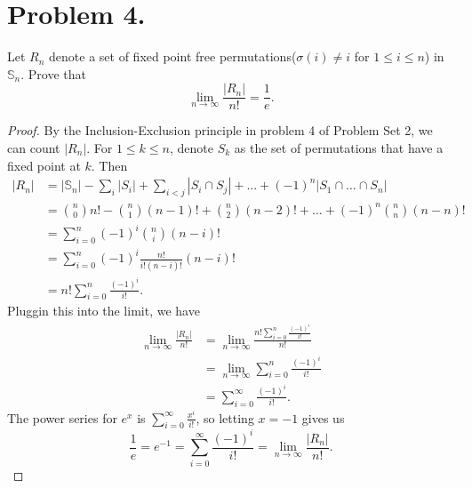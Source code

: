 \documentclass{article}
\begin{document}
\section{Problem 4.}
Let $R_n$ denote a set of fixed point free permutations($\sigma(i)\neq i$ for $1\leq i \leq n$) in $\mathbb{S}_n.$ Prove that
\[\lim_{n \rightarrow \infty}\frac{|R_n|}{n!} =\frac{1}{e}.\]
\begin{proof}
By the Inclusion-Exclusion principle in problem 4 of Problem Set 2, we can count $|R_n|$. For $1\leq k\leq n$, denote $S_k$ as the set of permutations that have a fixed point at $k$. Then
\begin{align*}
    |R_n|
    &=|\mathbb{S}_n|-\sum_i |S_i| + \sum_{i<j} |S_i\cap S_j| +...+(-1)^n|S_1\cap \dots \cap S_n|\\
    &=\binom{n}{0}n!-\binom{n}{1}(n-1)!+\binom{n}{2}(n-2)!+\dots+(-1)^n\binom{n}{n}(n-n)!\\
    &=\sum_{i=0}^n(-1)^i\binom{n}{i}(n-i)!\\
    &=\sum_{i=0}^n(-1)^i\frac{n!}{i!(n-i)!}(n-i)!\\
    &=n!\sum_{i=0}^n\frac{(-1)^i}{i!}.
\end{align*}
Pluggin this into the limit, we have
\begin{align*}
    \lim_{n \rightarrow \infty}\frac{|R_n|}{n!}
    &=\lim_{n \rightarrow \infty}\frac{n!\sum_{i=0}^n\frac{(-1)^i}{i!}}{n!}\\
    &=\lim_{n \rightarrow \infty}\sum_{i=0}^n\frac{(-1)^i}{i!}\\
    &=\sum_{i=0}^{\infty}\frac{(-1)^i}{i!}.
\end{align*}
The power series for $e^x$ is $\sum_{i=0}^{\infty}\frac{x^i}{i!}$, so letting $x=-1$ gives us
\[\frac{1}{e}=e^{-1}=\sum_{i=0}^{\infty}\frac{(-1)^i}{i!}=\lim_{n \rightarrow \infty}\frac{|R_n|}{n!}.\]
\end{proof}
\end{document}

